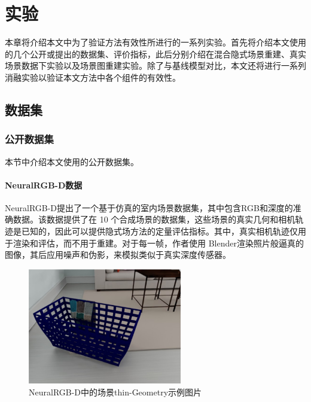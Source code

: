 \chapter{实验}
本章将介绍本文中为了验证方法有效性所进行的一系列实验。首先将介绍本文使用的几个公开或提出的数据集、评价指标，此后分别介绍在混合隐式场景重建、真实场景数据下实验以及场景图重建实验。除了与基线模型对比，本文还将进行一系列消融实验以验证本文方法中各个组件的有效性。


\section{数据集}
\subsection{公开数据集}
本节中介绍本文使用的公开数据集。
\subsubsection{NeuralRGB-D数据}
NeuralRGB-D\cite{azinovic_neural_2022}提出了一个基于仿真的室内场景数据集，其中包含RGB和深度的准确数据。该数据提供了在 10 个合成场景的数据集，这些场景的真实几何和相机轨迹是已知的，因此可以提供隐式场方法的定量评估指标。其中，真实相机轨迹仅用于渲染和评估，而不用于重建。对于每一帧，作者使用 Blender渲染照片般逼真的图像，其后应用噪声和伪影，来模拟类似于真实深度传感器\cite{zabatani_intel_2020, zhang_microsoft_2012}。

\begin{figure}[ht]
    \centering
    \includegraphics[width=0.6\textwidth]{undergraduate-thesis/images/experiments/neural-rgbd dataset.png}
    \caption{NeuralRGB-D\cite{azinovic_neural_2022}中的场景thin-Geometry示例图片}
    \label{fig:exp-neural-rgbd-data}
\end{figure}

